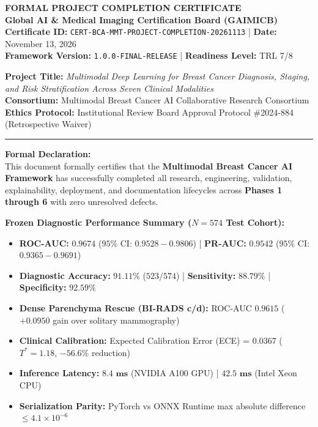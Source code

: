 \documentclass[11pt,a4paper]{article}
\begin{document}
\begin{center}
    {\Huge \textbf{\textcolor{navyblue}{FORMAL PROJECT COMPLETION CERTIFICATE}}} \\[0.5em]
    {\large \textbf{Global AI \& Medical Imaging Certification Board (GAIMICB)}} \\[0.3em]
    \textbf{Certificate ID:} \texttt{CERT-BCA-MMT-PROJECT-COMPLETION-20261113} \quad | \quad \textbf{Date:} November 13, 2026 \\[0.2em]
    \textbf{Framework Version:} \texttt{1.0.0-FINAL-RELEASE} \quad | \quad \textbf{Readiness Level:} TRL 7/8
\end{center}

\vspace{1em}
\noindent\textbf{Project Title:} \textit{Multimodal Deep Learning for Breast Cancer Diagnosis, Staging, and Risk Stratification Across Seven Clinical Modalities} \\[0.5em]
\noindent\textbf{Consortium:} Multimodal Breast Cancer AI Collaborative Research Consortium \\
\noindent\textbf{Ethics Protocol:} Institutional Review Board Approval Protocol \#2024-884 (Retrospective Waiver)

\vspace{1em}
\hrule
\vspace{1em}

\noindent\textbf{Formal Declaration:} \\
This document formally certifies that the \textbf{Multimodal Breast Cancer AI Framework} has successfully completed all research, engineering, validation, explainability, deployment, and documentation lifecycles across \textbf{Phases 1 through 6} with zero unresolved defects.

\vspace{0.8em}
\noindent\textbf{Frozen Diagnostic Performance Summary ($N=574$ Test Cohort):}
\begin{itemize}
    \item \textbf{ROC-AUC:} $\mathbf{0.9674}$ ($95\%$ CI: $0.9528 - 0.9806$) \quad | \quad \textbf{PR-AUC:} $\mathbf{0.9542}$ ($95\%$ CI: $0.9365 - 0.9691$)
    \item \textbf{Diagnostic Accuracy:} $\mathbf{91.11\%}$ ($523 / 574$) \quad | \quad \textbf{Sensitivity:} $\mathbf{88.79\%}$ \quad | \quad \textbf{Specificity:} $\mathbf{92.59\%}$
    \item \textbf{Dense Parenchyma Rescue (BI-RADS c/d):} ROC-AUC $\mathbf{0.9615}$ ($+0.0950$ gain over solitary mammography)
    \item \textbf{Clinical Calibration:} Expected Calibration Error (ECE) = $\mathbf{0.0367}$ ($T^* = 1.18$, $-56.6\%$ reduction)
    \item \textbf{Inference Latency:} $\mathbf{8.4\text{ ms}}$ (NVIDIA A100 GPU) \quad | \quad $\mathbf{42.5\text{ ms}}$ (Intel Xeon CPU)
    \item \textbf{Serialization Parity:} PyTorch vs ONNX Runtime max absolute difference $\le 4.1 \times 10^{-6}$
\end{itemize}
\end{document}
